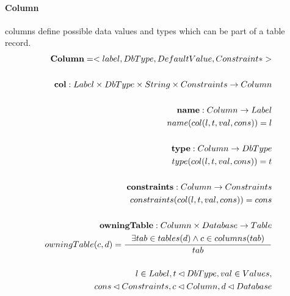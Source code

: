 \documentclass[11pt]{article}
\begin{document}
\paragraph{Column} columns define possible data values and types which can be part of a table record.
\begin{align*}
	\mathbf{Column} = <label, DbType, DefaultValue, Constraint*> \\ \\
	\mathbf{col} : Label \times DbType \times String \times Constraints \rightarrow Column \\ \\
	\mathbf{name} : Column \rightarrow Label  \\
	name(col(l, t, val, cons)) = l  \\ \\
	\mathbf{type} : Column \rightarrow DbType  \\
	type(col(l, t, val, cons)) = t  \\ \\
	\mathbf{constraints} : Column \rightarrow Constraints  \\
	constraints(col(l, t, val, cons)) = cons  \\ \\
	\mathbf{owningTable} : Column \times Database \rightarrow Table  \\
	owningTable(c, d) = \inference{\exists tab \in tables(d) \wedge c \in columns(tab)}{tab} \\ \\
l \in Label, t \lhd DbType, val \in Values,\\ cons \lhd Constraints, c \lhd Column,d \lhd Database
\end{align*}
\end{document}
